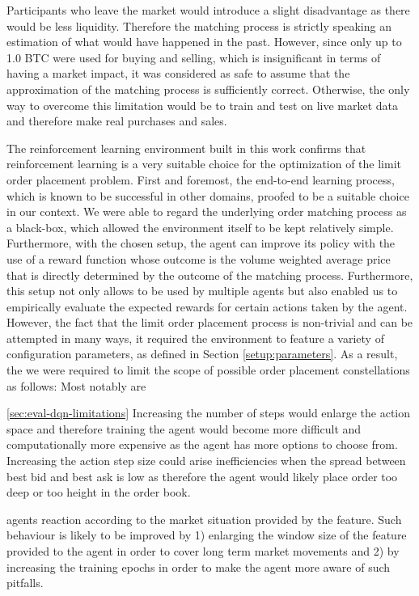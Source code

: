     Participants who leave the market would introduce a slight disadvantage as there would be less liquidity.
    Therefore the matching process is strictly speaking an estimation of what would have happened in the past.
    However, since only up to 1.0 BTC were used for buying and selling, which is insignificant in terms of having a market impact\cite{hautsch2012market}, it was considered as safe to assume that the approximation of the matching process is sufficiently correct.
    Otherwise, the only way to overcome this limitation would be to train and test on live market data and therefore make real purchases and sales.
    
    The reinforcement learning environment built in this work confirms that reinforcement learning is a very suitable choice for the optimization of the limit order placement problem.
    First and foremost, the end-to-end learning process, which is known to be successful in other domains\cite{amodei2016deep, mnih2015human, mnih2013playing}, proofed to be a suitable choice in our context.
    We were able to regard the underlying order matching process as a black-box, which allowed the environment itself to be kept relatively simple. 
    Furthermore, with the chosen setup, the agent can improve its policy with the use of a reward function whose outcome is the volume weighted average price that is directly determined by the outcome of the matching process.
    Furthermore, this setup not only allows to be used by multiple agents but also enabled us to empirically evaluate the expected rewards for certain actions taken by the agent.
    However, the fact that the limit order placement process is non-trivial and can be attempted in many ways, it required the environment to feature a variety of configuration parameters, as defined in Section \ref{setup:parameters}.
    As a result, the we were required to limit the scope of possible order placement constellations as follows:
    Most notably are 
    

\ref{sec:eval-dqn-limitations}
Increasing the number of steps would enlarge the action space and therefore training the agent
would become more difficult and computationally more expensive as the agent has more options to choose
from. Increasing the action step size could arise inefficiencies when the spread between best bid and best ask
is low as therefore the agent would likely place order too deep or too height in the order book.

agents reaction according to the market situation provided by the feature.
Such behaviour is likely to be improved by 1) enlarging the window size of the feature provided to the agent in order to cover long term market movements and 2) by increasing the training epochs in order to make the agent more aware of such pitfalls.


